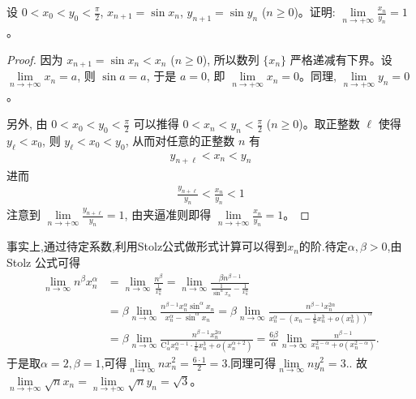 \documentclass[../../main.tex]{subfiles}%
\begin{document}
\begin{example}
设 $0 < x_0 < y_0 < \frac{\pi}{2}$, $x_{n + 1} = \sin x_n$, $y_{n + 1} = \sin y_n$ ($n \geqslant  0$)。证明: $\lim\limits_{n \to +\infty} \frac{x_n}{y_n} = 1$。
\end{example}
\begin{proof}

因为 $x_{n + 1} = \sin x_n < x_n$ ($n \geqslant  0$), 所以数列 $\{x_n\}$ 严格递减有下界。设 $\lim\limits_{n \to +\infty} x_n = a$, 则 $\sin a = a$, 于是 $a = 0$, 即 $\lim\limits_{n \to +\infty} x_n = 0$。同理, $\lim\limits_{n \to +\infty} y_n = 0$。

另外, 由 $0 < x_0 < y_0 < \frac{\pi}{2}$ 可以推得 $0 < x_n < y_n < \frac{\pi}{2}$ ($n \geqslant  0$)。取正整数 $\ell$ 使得 $y_{\ell} < x_0$, 则 $y_{\ell} < x_0 < y_0$, 从而对任意的正整数 $n$ 有
\begin{align*}
y_{n + \ell} < x_n < y_n
\end{align*}
进而
\begin{align*}
\frac{y_{n + \ell}}{y_n} < \frac{x_n}{y_n} < 1
\end{align*}
注意到 $\lim\limits_{n \to +\infty} \frac{y_{n + \ell}}{y_n} = 1$, 由夹逼准则即得 $\lim\limits_{n \to +\infty} \frac{x_n}{y_n} = 1$。 

\end{proof}
\begin{remark}
事实上,通过待定系数,利用Stolz公式做形式计算可以得到$x_n$的阶.待定$\alpha,\beta>0$,由 Stolz 公式可得
\begin{align*}
\underset{n\rightarrow \infty}{\lim}n^{\beta}x_{n}^{\alpha}&=\underset{n\rightarrow \infty}{\lim}\frac{n^{\beta}}{\frac{1}{x_{n}^{\alpha}}}=\underset{n\rightarrow \infty}{\lim}\frac{\beta n^{\beta -1}}{\frac{1}{\sin ^{\alpha}x_n}-\frac{1}{x_{n}^{\alpha}}}
\\
&=\beta \underset{n\rightarrow \infty}{\lim}\frac{n^{\beta -1}x_{n}^{\alpha}\sin ^{\alpha}x_n}{x_{n}^{\alpha}-\sin ^{\alpha}x_n}=\beta \underset{n\rightarrow \infty}{\lim}\frac{n^{\beta -1}x_{n}^{2\alpha}}{x_{n}^{\alpha}-\left( x_n-\frac{1}{6}x_{n}^{3}+o\left( x_{n}^{3} \right) \right) ^{\alpha}}
\\
&=\beta \underset{n\rightarrow \infty}{\lim}\frac{n^{\beta -1}x_{n}^{2\alpha}}{\mathrm{C}_{\alpha}^{1}x_{n}^{\alpha -1}\cdot \frac{1}{6}x_{n}^{3}+o\left( x_{n}^{\alpha +2} \right)}=\frac{6\beta}{\alpha}\underset{n\rightarrow \infty}{\lim}\frac{n^{\beta -1}}{x_{n}^{2-\alpha}+o\left( x_{n}^{2-\alpha} \right)}.
\end{align*}
于是取$\alpha=2,\beta=1$,可得$\underset{n\rightarrow \infty}{\lim}nx_{n}^{2}=\frac{6\cdot 1}{2}=3.$同理可得$\underset{n\rightarrow \infty}{\lim}ny_{n}^{2}=3.$.
故 $\lim\limits_{n \to +\infty} \sqrt{n} x_n = \lim\limits_{n \to +\infty} \sqrt{n} y_n = \sqrt{3}$。 
\end{remark}
\end{document}
